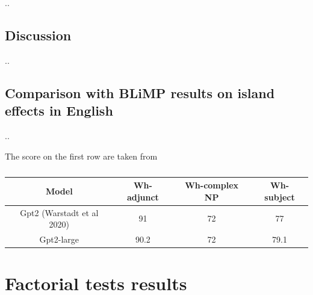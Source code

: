 ..
\subsection{Discussion}

..


\subsection{Comparison with BLiMP results on island effects in English}

..

The score on the first row are taken from \citet{warstadt2020blimp}


\begin{table} \scriptsize 
	\begin{center}
		\begin{tabular}
			{c|c|c|c} \\
			Model & \textbf{Wh-adjunct} & \textbf{Wh-complex NP} & \textbf{Wh-subject} \\
			\hline
			Gpt2 (Warstadt et al 2020) & 91 & 72 & 77 \\ 
			Gpt2-large & 90.2 & 72 & 79.1 \\ 
	  	
		\end{tabular}
		\caption{}
		\label{tab:accResultsBLiMP}
	\end{center}
\end{table}

\section{Factorial tests results}



